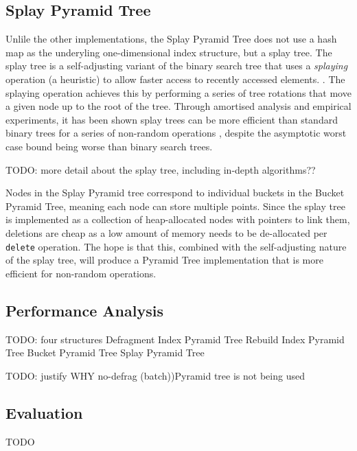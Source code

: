 \subsection{Splay Pyramid Tree}

Unlile the other implementations, the Splay Pyramid Tree does not use a hash map as the underyling one-dimensional index structure, but a splay tree. The splay tree is a self-adjusting variant of the binary search tree that uses a \textit{splaying} operation (a heuristic) to allow faster access to recently accessed elements. \cite{splay-tree}. The splaying operation achieves this by performing a series of tree rotations that move a given node up to the root of the tree. Through amortised analysis and empirical experiments, it has been shown splay trees can be more efficient than standard binary trees for a series of non-random operations \cite{splay-tree, TODO}, despite the asymptotic worst case bound being worse than binary search trees.

TODO: more detail about the splay tree, including in-depth algorithms??

Nodes in the Splay Pyramid tree correspond to individual buckets in the Bucket Pyramid Tree, meaning each node can store multiple points. Since the splay tree is implemented as a collection of heap-allocated nodes with pointers to link them, deletions are cheap as a low amount of memory needs to be de-allocated per \texttt{delete} operation. The hope is that this, combined with the self-adjusting nature of the splay tree, will produce a Pyramid Tree implementation that is more efficient for non-random operations.

\subsection{Performance Analysis}

TODO: four structures
	Defragment Index Pyramid Tree
	Rebuild Index Pyramid Tree
	Bucket Pyramid Tree
	Splay Pyramid Tree

TODO: justify WHY no-defrag (batch))Pyramid tree is not being used

\subsection{Evaluation}

TODO
